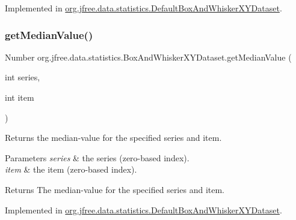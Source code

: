 Implemented in \mbox{\hyperlink{classorg_1_1jfree_1_1data_1_1statistics_1_1_default_box_and_whisker_x_y_dataset_a304903af30ed69f64ecad290fbfef916}{org.\+jfree.\+data.\+statistics.\+Default\+Box\+And\+Whisker\+X\+Y\+Dataset}}.

\mbox{\label{interfaceorg_1_1jfree_1_1data_1_1statistics_1_1_box_and_whisker_x_y_dataset_aaf7ccfc01f6781e32bf674818aba2a7f}} 
\subsubsection{\texorpdfstring{get\+Median\+Value()}{getMedianValue()}}
{\footnotesize\ttfamily Number org.\+jfree.\+data.\+statistics.\+Box\+And\+Whisker\+X\+Y\+Dataset.\+get\+Median\+Value (\begin{DoxyParamCaption}\item[{int}]{series,  }\item[{int}]{item }\end{DoxyParamCaption})}

Returns the median-\/value for the specified series and item.


\begin{DoxyParams}{Parameters}
{\em series} & the series (zero-\/based index). \\
\hline
{\em item} & the item (zero-\/based index).\\
\hline
\end{DoxyParams}
\begin{DoxyReturn}{Returns}
The median-\/value for the specified series and item. 
\end{DoxyReturn}


Implemented in \mbox{\hyperlink{classorg_1_1jfree_1_1data_1_1statistics_1_1_default_box_and_whisker_x_y_dataset_abae40a79cd11132e2fbc3a6f708a654b}{org.\+jfree.\+data.\+statistics.\+Default\+Box\+And\+Whisker\+X\+Y\+Dataset}}.

\mbox{\label{interfaceorg_1_1jfree_1_1data_1_1statistics_1_1_box_and_whisker_x_y_dataset_a3008c9b45ede75485f3f1f8d3443dda3}} 
